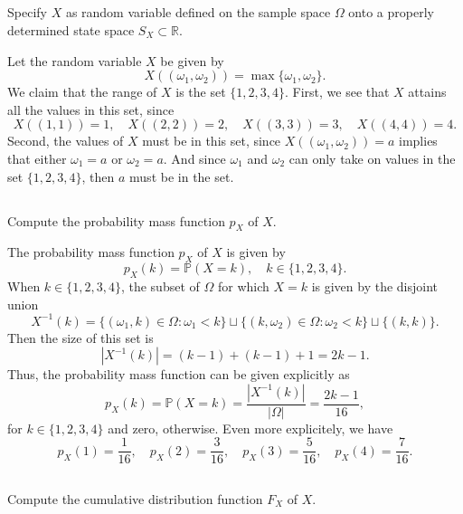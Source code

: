 \documentclass[12pt]{article}
\newenvironment{problem}
    {\begin{lrbox}{\mybox}\begin{minipage}{0.98\textwidth}}
    {\end{minipage}\end{lrbox}\framebox[\textwidth]{\usebox{\mybox}}}
\newcommand{\R}{\mathbb{R}}
\renewcommand{\P}{\mathbb{P}}
\begin{document}
\subsection{}
\begin{problem}
    Specify $X$ as random variable defined on the sample space $\Omega$ onto a properly determined state space $S_X \subset \R$.
\end{problem}
\medskip

Let the random variable $X$ be given by
\[
    X((\omega_1, \omega_2)) = \max\{\omega_1, \omega_2\}.
\]
We claim that the range of $X$ is the set $\{1, 2, 3, 4\}$. First, we see that $X$ attains all the values in this set, since
\[
    X((1, 1)) = 1, \quad X((2, 2)) = 2, \quad X((3, 3)) = 3, \quad X((4, 4)) = 4.
\]
Second, the values of $X$ must be in this set, since $X((\omega_1, \omega_2)) = a$ implies that either $\omega_1 = a$ or $\omega_2 = a$. And since $\omega_1$ and $\omega_2$ can only take on values in the set $\{1, 2, 3, 4\}$, then $a$ must be in the set.

\subsection{}
\begin{problem}
    Compute the probability mass function $p_X$ of $X$.
\end{problem}
\medskip

The probability mass function $p_X$ of $X$ is given by
\[
    p_X(k) = \P(X = k), \quad k \in \{1, 2, 3, 4\}.
\]
When $k \in \{1, 2, 3, 4\}$, the subset of $\Omega$ for which $X = k$ is given by the disjoint union
\[
    X^{-1}(k) = \{(\omega_1, k) \in \Omega : \omega_1 < k\} \sqcup \{(k, \omega_2) \in \Omega : \omega_2 < k\} \sqcup \{(k, k)\}.
\]
Then the size of this set is
\[
    |X^{-1}(k)| = (k - 1) + (k - 1) + 1 = 2k - 1.
\]
Thus, the probability mass function can be given explicitly as
\[
    p_X(k) = \P(X = k) = \frac{|X^{-1}(k)|}{|\Omega|} = \frac{2k - 1}{16},
\]
for $k \in \{1, 2, 3, 4\}$ and zero, otherwise. Even more explicitely, we have
\[
    p_X(1) = \frac{1}{16}, \quad p_X(2) = \frac{3}{16}, \quad p_X(3) = \frac{5}{16}, \quad p_X(4) = \frac{7}{16}.
\]

\newpage
\subsection{}
\begin{problem}
    Compute the cumulative distribution function $F_X$ of $X$.
\end{problem}
\medskip
\end{document}
